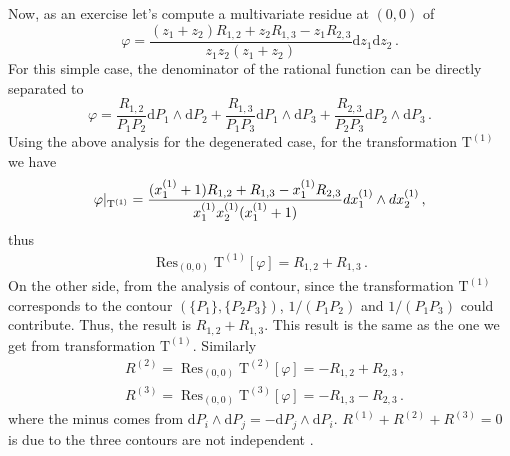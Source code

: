 \documentclass[a4paper,11pt]{article}
\newcommand{\nn}{\nonumber}
\newcommand{\nd}{\mathrm{d}}
\newcommand{\nT}{\mathrm{T}}
\newcommand{\bea}{\begin{eqnarray}}
\newcommand{\eea}{\end{eqnarray}}
\DeclareMathOperator{\Res}{Res}
\begin{document}
Now, as an exercise let's compute a multivariate residue  at $(0,0)$ of
\begin{equation}
\varphi=\frac{\left(z_1+z_2\right) R_{1,2}+z_2 R_{1,3}-z_1 R_{2,3}}{z_1 z_2 \left(z_1+z_2\right)}\nd z_1 \nd z_2 \, .
\end{equation}
For this simple case, the denominator of the rational function  can be directly separated to
\begin{equation}
\varphi=\frac{R_{1,2}}{P_1 P_2}\nd P_1 \wedge \nd P_2 + \frac{R_{1,3}}{P_1 P_3}\nd P_1 \wedge \nd P_3+\frac{R_{2,3}}{P_2 P_3}\nd P_2 \wedge \nd P_3 \, .
\end{equation}
Using the above analysis for the degenerated case, for the transformation $\nT^{(1)}$ we have 
%
\bea \varphi|_{\nT^{(1)}}={ (x_1^{(1)}+1) R_{1,2}+ R_{1,3}-x_1^{(1)} R_{2,3}\over x_1^{(1)}x_2^{(1)}(x_1^{(1)}+1) }
dx_1^{(1)}\wedge dx_2^{(1)} \, , \eea
%
thus
%
\bea \Res_{(0,0)} \nT^{(1)}[\varphi] = R_{1,2}+R_{1,3} \,. \eea
%
On the other side, from the analysis of contour, since the transformation $\nT^{(1)}$ corresponds to the contour $(\{P_1\},\{P_2 P_3\})$, $1/(P_1P_2)$ and $1/(P_1P_3)$ could contribute. Thus, the result is $R_{1,2}+R_{1,3}$. This result is the same as the one we get from transformation $\nT^{(1)}$. 
Similarly
\begin{align}
&R^{(2)}=\Res_{(0,0)} \nT^{(2)}[\varphi] = -R_{1,2}+R_{2,3}  \,,\nn\\
&R^{(3)}=\Res_{(0,0)} \nT^{(3)}[\varphi] = -R_{1,3}-R_{2,3} \, .
\end{align}
where the minus comes from $\nd P_i \wedge \nd P_j = -\nd P_j \wedge \nd P_i $. 
 $R^{(1)}+R^{(2)}+R^{(3)}=0$ is due to the three contours are not independent \cite{Larsen:2017aqb}.
\end{document}
